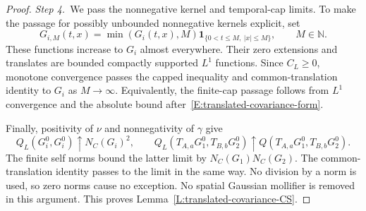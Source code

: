 \documentclass[12pt,oneside,openany]{book}
\numberwithin{equation}{section}
\theoremstyle{nogostyle}
\theoremstyle{definition}
\newcommand{\N}{\mathbb{N}}
\begin{document}
\begin{proof}
  \medskip
  \noindent\textit{Step 4.~}We pass the nonnegative kernel and temporal-cap
  limits.
  To make the passage for possibly unbounded nonnegative kernels explicit, set
  \[
    G_{i,M}(t,x)=\min(G_i(t,x),M)
    \mathbf1_{\{0<t\le M,\ |x|\le M\}},\qquad M\in\N.
  \]
  These functions increase to $G_i$ almost everywhere. Their zero extensions and
  translates are bounded compactly supported $L^1$ functions. Since $C_L \ge 0$,
  monotone convergence passes the capped inequality and common-translation
  identity to $G_i$ as $M \to \infty$. Equivalently, the finite-cap passage
  follows from $L^1$ convergence and the absolute bound
  after~\eqref{E:translated-covariance-form}.

  Finally, positivity of $\nu$ and nonnegativity of $\gamma$ give
  \[
    Q_L(G_i^0,G_i^0)\uparrow N_C(G_i)^2,\qquad
    Q_L(T_{A,a}G_1^0,T_{B,b}G_2^0)
    \uparrow Q(T_{A,a}G_1^0,T_{B,b}G_2^0).
  \]
  The finite self norms bound the latter limit by $N_C(G_1)N_C(G_2)$. The
  common-translation identity passes to the limit in the same way. No division
  by a norm is used, so zero norms cause no exception. No spatial Gaussian
  mollifier is removed in this argument. This proves
  Lemma~\ref{L:translated-covariance-CS}.
\end{proof}
\end{document}
